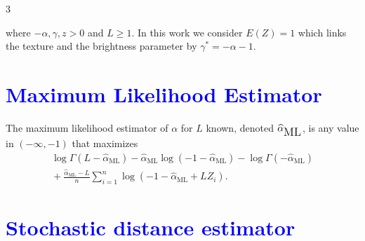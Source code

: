 \documentclass[a0,portrait]{a0poster}
\begin{document}
\begin{parcolumns}[colwidths={1=.3\textwidth,2=.39\textwidth},rulebetweencolor=blue
	,rulebetween=true]{3}
{\begin{minipage}[t]{0.95\linewidth}
where $-\alpha,\gamma ,z>0$ and $L\geq 1$. In this work we consider $E(Z)=1$ which links the texture and the brightness parameter by $\gamma^* =-\alpha-1$.

\vspace{0.54cm}



\section*{\textcolor{blue}{Maximum Likelihood Estimator }}
The maximum likelihood estimator of $\alpha$ for $L$ known, denoted $\widehat\alpha_{\text{\tiny{ML}}}$, is any value in $(-\infty,-1)$ that maximizes
{\small
	\begin{align*}
		\log \Gamma(L-\widehat\alpha_{\text{ML}})-
		\widehat\alpha_{\text{ML}}\log(-1-\widehat\alpha_{\text{ML}})
		-\log\Gamma(-\widehat\alpha_{\text{ML}}) \nonumber \\
		\mbox{}+\frac{\widehat\alpha_{\text{ML}}-L}{n} \sum_{i=1}^n\log(-1-\widehat\alpha_{\text{ML}}+L Z_i).
		\label{ML}
	\end{align*}
}
\section*{\textcolor{blue}{Stochastic distance estimator}}

\begin{center}
\end{center}
\end{minipage}}
\end{parcolumns}
\end{document}
